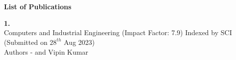 
\chapter*{}
\vspace*{-3.5cm}

\vspace{11ex}
\addchaptertocentry{\listofpublication} %
    \textbf{\huge {List of Publications}}

\vspace{7ex}



\noindent\textbf{1.\ReportTitel}\\ Computers and Industrial Engineering (Impact Factor: 7.9) Indexed by SCI (Submitted on $28^{th}$ Aug 2023)\\
Authors - \fAuthor { }and  Vipin Kumar\\




\vspace*{0.7cm}
